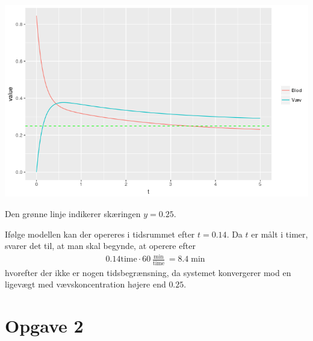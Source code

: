 \documentclass[12pt]{article}
\begin{document}
\begin{center}
\includegraphics[scale=0.5]{q1p3.png}
\end{center}
Den grønne linje indikerer skæringen $y=0.25$. 

Ifølge modellen kan der opereres i tidsrummet efter $t=0.14$. Da $t$ er målt i timer, svarer det til, at man skal begynde, at operere efter
\begin{align}
0.14\text{time}\cdot 60 \frac{\min}{\text{time}} = 8.4\min
\end{align}
hvorefter der ikke er nogen tidsbegrænsning, da systemet konvergerer mod en ligevægt med vævskoncentration højere end $0.25$.

\section{Opgave 2}
\end{document}
